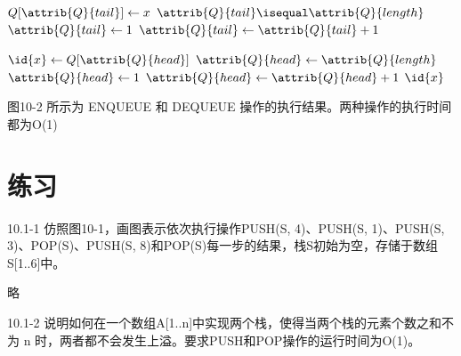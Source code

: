 \documentclass[a4paper,11pt]{ctexbook}
\begin{document}
\begin{codebox}
	\li $ Q[\attrib{Q}{tail}] \gets x $
	\li \If $\attrib{Q}{tail} \isequal \attrib{Q}{length} $
	\li \Then $ \attrib{Q}{tail} \gets 1 $
	\li \Else $ \attrib{Q}{tail} \gets \attrib{Q}{tail} + 1 $
\end{codebox}
\begin{codebox}
	\li $ \id{x} \gets Q[\attrib{Q}{head}] $
	\li \If $\attrib{Q}{head} \gets \attrib{Q}{length}$
	\li \Then $ \attrib{Q}{head} \gets 1 $
	\li \Else $ \attrib{Q}{head} \gets \attrib{Q}{head} + 1 $
		\End
	\li \Return $ \id{x} $
\end{codebox}

图10-2 所示为 ENQUEUE 和 DEQUEUE 操作的执行结果。两种操作的执行时间都为O(1)

\section*{练习}
10.1-1 仿照图10-1，画图表示依次执行操作PUSH(S, 4)、PUSH(S, 1)、PUSH(S, 3)、POP(S)、PUSH(S, 8)和POP(S)每一步的结果，栈S初始为空，存储于数组S[1..6]中。

略

10.1-2 说明如何在一个数组A[1..n]中实现两个栈，使得当两个栈的元素个数之和不为 n 时，两者都不会发生上溢。要求PUSH和POP操作的运行时间为O(1)。
\end{document}
